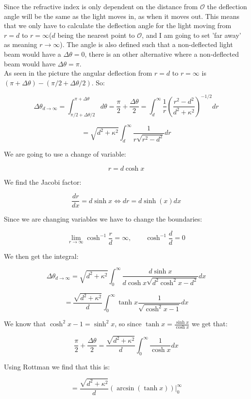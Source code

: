 \documentclass[a4paper,norsk, 10pt]{article}
\begin{document}
Since the refractive index is only dependent on the distance from $\mathcal{O}$ the deflection angle will be the same as the light moves in, as when it moves out. This means that we only have to calculate the deflection angle for the light moving from $r = d$ to $r = \infty$($d$ being the nearest point to $\mathcal{O}$, and I am going to set 'far away' as meaning $r\rightarrow \infty$). The angle is also defined such that a non-deflected light beam would have a $\Delta \theta = 0$, there is an other alternative where a non-deflected beam would have $\Delta \theta = \pi$. \\

As seen in the picture the angular deflection from $r = d$ to $r = \infty$ is $(\pi + \Delta\theta) - (\pi/2 +\Delta\theta/2)$. So:

$$
\Delta\theta_{d\rightarrow \infty}=\int_{\pi/2 +\Delta\theta/2}^{\pi + \Delta\theta} d\theta = \frac{\pi}{2} + \frac{\Delta \theta}{2} = \int_d^{\infty} \frac{1}{r}\left(\frac{r^2 -d^2}{d^2 +\kappa^2}\right)^{-1/2}dr
$$

$$
= \sqrt{d^2 +\kappa^2}\int_d^{\infty} \frac{1}{r\sqrt{r^2 - d^2}}dr
$$

We are going to use a change of variable:

$$
r = d \cosh x
$$

We find the Jacobi factor:

$$
\frac{dr}{dx} = d\sinh x \Leftrightarrow dr = d\sinh(x) dx
$$

Since we are changing variables we have to change the boundaries:

$$
\lim_{r\rightarrow \infty}\cosh^{-1} \frac{r}{d} = \infty, \qquad \cosh^{-1}\frac{d}{d} = 0
$$

We then get the integral:

$$
\Delta\theta_{d\rightarrow \infty} = \sqrt{d^2 +\kappa^2}\int_0^{\infty} \frac{d\sinh x}{d\cosh x\sqrt{d^2\cosh^2 x - d^2}}dx
$$

$$
= \frac{\sqrt{d^2 +\kappa^2}}{d}\int_0^{\infty} \tanh x \frac{1}{\sqrt{\cosh^2 x - 1}}dx
$$

We know that $\cosh^2 x - 1 = \sinh^2 x$, so since $\tanh x = \frac{\sinh x}{\cosh x}$ we get that:

$$
\frac{\pi}{2} + \frac{\Delta \theta}{2} = \frac{\sqrt{d^2 +\kappa^2}}{d}\int_0^{\infty} \frac{1}{\cosh x}dx
$$

Using Rottman we find that this is:

$$
= \frac{\sqrt{d^2 +\kappa^2}}{d} (\arcsin(\tanh x)) \bigg|_0^{\infty}
$$
\end{document}
